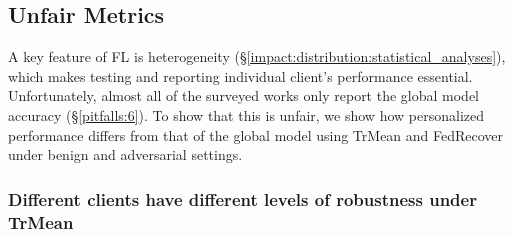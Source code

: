 \subsection{Unfair Metrics}\label{impact:evaluation}
A key feature of FL is heterogeneity (\S\ref{impact:distribution:statistical_analyses}), which makes testing and reporting individual client's performance essential. Unfortunately, almost all of the surveyed works only report the global model accuracy (\S\ref{pitfalls:6}). To show that this is unfair, we show how personalized performance differs from that of the global model using TrMean and FedRecover under benign and adversarial settings.
\subsubsection{Different clients have different levels of robustness under TrMean}\label{impact:evaluation:trmean}

